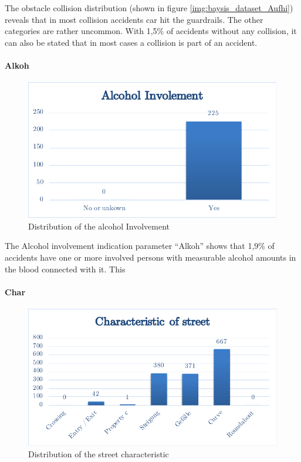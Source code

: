 \documentclass[a4paper,12pt]{report}
\begin{document}
The obstacle collision distribution (shown in figure \ref{img:baysis_dataset_Aufhi}) reveals that in most collision accidents car hit the guardrails. The other categories are rather uncommon. With 1,5\% of accidents without any collision, it can also be stated that in most cases a collision is part of an accident.

\paragraph{Alkoh}
\begin{figure}[h]
	\centering
	\includegraphics[scale=0.6]{./assets/baysis_dataset_Alkoh.pdf}
	\caption{Distribution of the alcohol Involvement}
	\label{img:baysis_dataset_Alkoh}
\end{figure}

The Alcohol involvement indication parameter “Alkoh” shows that 1,9\% of accidents have one or more involved persons with measurable alcohol amounts in the blood connected with it. This

\paragraph{Char}
\begin{figure}[h]
	\centering
	\includegraphics[scale=0.6]{./assets/baysis_dataset_Char.pdf}
	\caption{Distribution of the street characteristic}
	\label{img:baysis_dataset_Char}
\end{figure}
\end{document}
